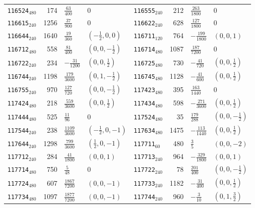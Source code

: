 {\begin{longtable}{@{}lrll@{\hspace{2em}}lrll@{}}
\texttt{116524}$_{480}$ & 174 & $\tfrac{63}{400}$ & 0 & \texttt{116555}$_{240}$ & 212 & $\tfrac{263}{1800}$ & 0\\
\texttt{116615}$_{240}$ & 1256 & $\tfrac{37}{900}$ & 0 & \texttt{116622}$_{240}$ & 628 & $\tfrac{127}{1800}$ & 0\\
\texttt{116644}$_{240}$ & 1640 & $\tfrac{19}{360}$ & $(-\tfrac{1}{2},0,0)$ & \texttt{116711}$_{120}$ & 764 & $-\tfrac{199}{1800}$ & $(0,0,1)$\\
\texttt{116712}$_{480}$ & 558 & $\tfrac{81}{400}$ & $(0,0,-\tfrac{1}{2})$ & \texttt{116714}$_{480}$ & 1087 & $\tfrac{187}{7200}$ & 0\\
\texttt{116722}$_{240}$ & 234 & $-\tfrac{31}{1200}$ & $(0,0,\tfrac{1}{2})$ & \texttt{116725}$_{480}$ & 730 & $-\tfrac{41}{720}$ & $(0,0,\tfrac{1}{2})$\\
\texttt{116744}$_{240}$ & 1198 & $\tfrac{179}{3600}$ & $(0,1,-\tfrac{1}{2})$ & \texttt{116745}$_{480}$ & 1128 & $-\tfrac{41}{600}$ & $(0,0,\tfrac{1}{2})$\\
\texttt{116755}$_{240}$ & 970 & $\tfrac{127}{720}$ & $(0,0,-\tfrac{1}{2})$ & \texttt{117423}$_{480}$ & 395 & $\tfrac{163}{1440}$ & 0\\
\texttt{117424}$_{480}$ & 218 & $\tfrac{559}{3600}$ & $(0,0,\tfrac{1}{2})$ & \texttt{117434}$_{480}$ & 598 & $-\tfrac{271}{3600}$ & $(0,0,\tfrac{1}{2})$\\
\texttt{117444}$_{480}$ & 525 & $\tfrac{11}{96}$ & 0 & \texttt{117524}$_{480}$ & 35 & $\tfrac{179}{288}$ & $(0,0,-\tfrac{1}{2})$\\
\texttt{117544}$_{240}$ & 238 & $\tfrac{1109}{3600}$ & $(-\tfrac{1}{2},0,-1)$ & \texttt{117634}$_{480}$ & 1475 & $-\tfrac{113}{1440}$ & $(0,0,\tfrac{1}{2})$\\
\texttt{117644}$_{240}$ & 1298 & $\tfrac{799}{3600}$ & $(\tfrac{1}{2},0,-1)$ & \texttt{117711}$_{60}$ & 480 & $\tfrac{3}{5}$ & $(0,0,-2)$\\
\texttt{117712}$_{240}$ & 284 & $\tfrac{41}{1800}$ & $(0,0,1)$ & \texttt{117713}$_{240}$ & 964 & $-\tfrac{329}{1800}$ & $(0,0,1)$\\
\texttt{117714}$_{480}$ & 750 & $\tfrac{5}{48}$ & 0 & \texttt{117722}$_{240}$ & 78 & $\tfrac{201}{400}$ & $(0,0,-\tfrac{1}{2})$\\
\texttt{117724}$_{480}$ & 607 & $\tfrac{1867}{7200}$ & $(0,0,-1)$ & \texttt{117733}$_{240}$ & 1182 & $-\tfrac{31}{400}$ & $(0,0,\tfrac{1}{2})$\\
\texttt{117734}$_{480}$ & 1097 & $\tfrac{1877}{7200}$ & $(0,0,-1)$ & \texttt{117744}$_{240}$ & 960 & $-\tfrac{3}{10}$ & $(0,1,\tfrac{3}{2})$\\

\end{longtable}}
